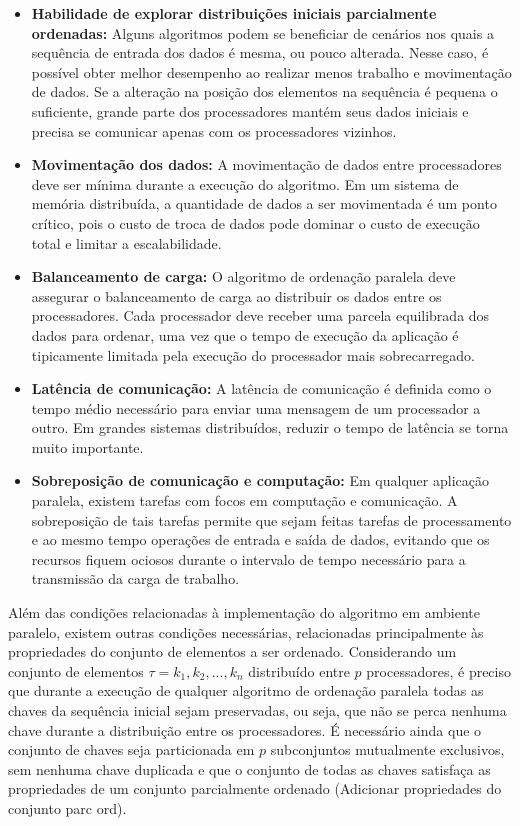 \begin{itemize}
\item \textbf{Habilidade de explorar distribuições iniciais parcialmente ordenadas:}
Alguns algoritmos podem se beneficiar de cenários nos quais a sequência de entrada dos dados é mesma, ou pouco alterada. Nesse caso, é possível obter melhor desempenho ao realizar menos trabalho e movimentação de dados.
Se a alteração na posição dos elementos na sequência é pequena o suficiente, grande parte dos processadores mantém seus dados iniciais e precisa se comunicar apenas com os processadores vizinhos.

\item \textbf{Movimentação dos dados:}
A movimentação de dados entre processadores deve ser mínima durante a execução do algoritmo. Em um sistema de memória distribuída, a quantidade de dados a ser movimentada é um ponto crítico, pois o custo de troca de dados pode dominar o custo de execução total e limitar a escalabilidade.

\item \textbf{Balanceamento de carga:}
O algoritmo de ordenação paralela deve assegurar o balanceamento de carga ao distribuir os dados entre os processadores. Cada processador deve receber uma parcela equilibrada dos dados para ordenar, uma vez que o tempo de execução da aplicação é tipicamente limitada pela execução do processador mais sobrecarregado.

\item \textbf{Latência de comunicação:}
A latência de comunicação é definida como o tempo médio necessário para enviar uma mensagem de um processador a outro.
Em grandes sistemas distribuídos, reduzir o tempo de latência se torna muito importante.

\item \textbf{Sobreposição de comunicação e computação:}
Em qualquer aplicação paralela, existem tarefas com focos em computação e comunicação. A sobreposição de tais tarefas permite que sejam feitas tarefas de processamento e ao mesmo tempo operações de entrada e saída de dados, evitando que os recursos fiquem ociosos durante o intervalo de tempo necessário para a transmissão da carga de trabalho.

\end{itemize}


Além das condições relacionadas à implementação do algoritmo em ambiente paralelo, existem outras condições necessárias, relacionadas principalmente às propriedades do conjunto de elementos a ser ordenado. Considerando um conjunto de elementos $ \tau = {k_1, k_2, ... , k_n} $ distribuído entre $p$ processadores, é preciso que durante a execução de qualquer algoritmo de ordenação paralela todas as chaves da sequência inicial sejam preservadas, ou seja, que não se perca nenhuma chave durante a distribuição entre os processadores. É necessário ainda que o conjunto de chaves seja particionada em $p$ subconjuntos mutualmente exclusivos, sem nenhuma chave duplicada e que o conjunto de todas as chaves satisfaça as propriedades de um conjunto parcialmente ordenado (Adicionar propriedades do conjunto parc ord).

